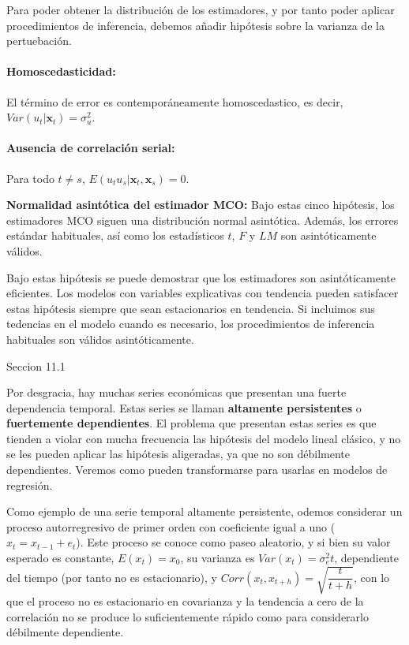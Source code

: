 Para poder obtener la distribuci\'on de los estimadores, y por tanto poder aplicar procedimientos de inferencia, debemos a\~nadir hip\'otesis sobre la varianza de la pertuebaci\'on.
\paragraph*{Homoscedasticidad:}
El t\'ermino de error es contempor\'aneamente homoscedastico, es decir, $Var(u_t|\boldsymbol{x}_t)=\sigma_u^2$.

\paragraph*{Ausencia de correlaci\'on serial:}
Para todo $t\neq s$,  $E(u_tu_s|\boldsymbol{x}_t,\boldsymbol{x}_s)=0$.

\begin{teorema}
\textbf{Normalidad asint\'otica del estimador MCO:} Bajo estas cinco hip\'otesis, los estimadores MCO siguen una distribuci\'on normal asint\'otica. Adem\'as, los errores est\'andar habituales, as\'i como los estad\'isticos $t$, $F$ y $LM$ son asint\'oticamente v\'alidos.
\end{teorema}


Bajo estas hip\'otesis se puede demostrar que los estimadores son asint\'oticamente eficientes. Los modelos con variables explicativas con tendencia pueden satisfacer estas hip\'otesis siempre que sean estacionarios en tendencia. Si incluimos  sus tedencias en el modelo cuando es necesario, los procedimientos de inferencia habituales son v\'alidos asint\'oticamente.

Seccion 11.1

Por desgracia, hay muchas series econ\'omicas que presentan una fuerte dependencia temporal. Estas series se llaman \textbf{altamente persistentes} o \textbf{fuertemente dependientes}. El problema que presentan estas series es que tienden a violar con mucha frecuencia las hip\'otesis del modelo lineal cl\'asico, y no se les pueden aplicar las hip\'otesis aligeradas, ya que no son d\'ebilmente dependientes. Veremos como pueden transformarse para usarlas en modelos de regresi\'on.

Como ejemplo de una serie temporal altamente persistente, odemos considerar un proceso autorregresivo de primer orden con coeficiente igual a uno ($x_t=x_{t-1}+e_t$). Este proceso se conoce como paseo aleatorio, y si bien su valor esperado es constante, $E(x_t)=x_0$, su varianza es $Var(x_t)=\sigma_e^2t$, dependiente del tiempo (por tanto no es estacionario), y $Corr(x_t,x_{t+h})=\sqrt{\dfrac{t}{t+h}}$, con lo que el proceso no es estacionario en covarianza y la tendencia a cero de la correlaci\'on no se produce lo suficientemente r\'apido como para considerarlo d\'ebilmente dependiente.

